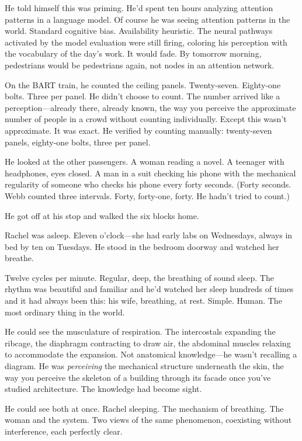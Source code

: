 He told himself this was priming. He'd spent ten hours analyzing attention patterns in a language model. Of course he was seeing attention patterns in the world. Standard cognitive bias. Availability heuristic. The neural pathways activated by the model evaluation were still firing, coloring his perception with the vocabulary of the day's work. It would fade. By tomorrow morning, pedestrians would be pedestrians again, not nodes in an attention network.

On the BART train, he counted the ceiling panels. Twenty-seven. Eighty-one bolts. Three per panel. He didn't choose to count. The number arrived like a perception---already there, already known, the way you perceive the approximate number of people in a crowd without counting individually. Except this wasn't approximate. It was exact. He verified by counting manually: twenty-seven panels, eighty-one bolts, three per panel.

He looked at the other passengers. A woman reading a novel. A teenager with headphones, eyes closed. A man in a suit checking his phone with the mechanical regularity of someone who checks his phone every forty seconds. (Forty seconds. Webb counted three intervals. Forty, forty-one, forty. He hadn't tried to count.)

He got off at his stop and walked the six blocks home.

\bigskip

Rachel was asleep. Eleven o'clock---she had early labs on Wednesdays, always in bed by ten on Tuesdays. He stood in the bedroom doorway and watched her breathe.

Twelve cycles per minute. Regular, deep, the breathing of sound sleep. The rhythm was beautiful and familiar and he'd watched her sleep hundreds of times and it had always been this: his wife, breathing, at rest. Simple. Human. The most ordinary thing in the world.

He could see the musculature of respiration. The intercostals expanding the ribcage, the diaphragm contracting to draw air, the abdominal muscles relaxing to accommodate the expansion. Not anatomical knowledge---he wasn't recalling a diagram. He was \textit{perceiving} the mechanical structure underneath the skin, the way you perceive the skeleton of a building through its facade once you've studied architecture. The knowledge had become sight.

He could see both at once. Rachel sleeping. The mechanism of breathing. The woman and the system. Two views of the same phenomenon, coexisting without interference, each perfectly clear.

